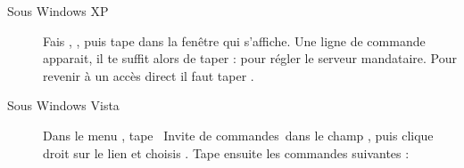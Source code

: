 \begin{description}

\item[Sous Windows XP] Fais , , puis
tape  dans la fenêtre qui s'affiche. Une ligne de commande apparait,
il te suffit alors de taper :  pour régler
le serveur mandataire. Pour revenir à un accès direct il faut taper .

\item[Sous Windows Vista]
Dans le menu , tape \guillemotleft~Invite de commandes~\guillemotright dans le champ , puis clique droit sur le lien
et choisis . Tape ensuite les commandes suivantes :



\end{description}
